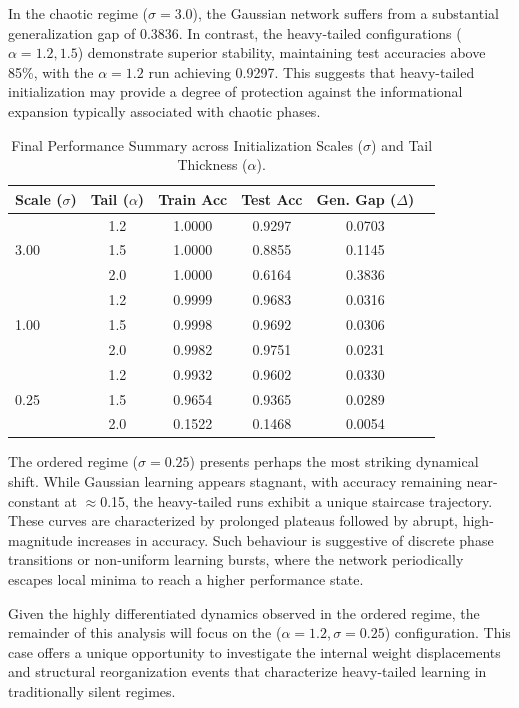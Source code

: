 \documentclass[11pt,a4paper]{article}
\begin{document}
In the chaotic regime ($\sigma=3.0$), the Gaussian network suffers from a substantial generalization gap of 0.3836. In contrast, the heavy-tailed configurations ($\alpha=1.2,1.5$) demonstrate superior stability, maintaining test accuracies above 85\%, with the $\alpha=1.2$ run achieving 0.9297. This suggests that heavy-tailed initialization may provide a degree of protection against the informational expansion typically associated with chaotic phases.

\begin{table}[htbp]
\centering
\caption{Final Performance Summary across Initialization Scales ($\sigma$) and Tail Thickness ($\alpha$).}
\label{tab:performance_summary}
\begin{tabular}{lccccr}
\toprule
\textbf{Scale ($\sigma$)} & \textbf{Tail ($\alpha$)} & \textbf{Train Acc} & \textbf{Test Acc} & \textbf{Gen. Gap ($\Delta$)} \\ \midrule
\multirow{3}{*}{3.00} & 1.2 & 1.0000 & 0.9297 & 0.0703 \\
                      & 1.5 & 1.0000 & 0.8855 & 0.1145\\
                      & 2.0 & 1.0000 & 0.6164 & 0.3836\\ \hline
\multirow{3}{*}{1.00} & 1.2 & 0.9999 & 0.9683 & 0.0316 \\
                      & 1.5 & 0.9998 & 0.9692 & 0.0306 \\
                      & 2.0 & 0.9982 & 0.9751 & 0.0231 \\ \hline
\multirow{3}{*}{0.25} & 1.2 & 0.9932 & 0.9602 & 0.0330 \\
                      & 1.5 & 0.9654 & 0.9365 & 0.0289 \\
                      & 2.0 & 0.1522 & 0.1468 & 0.0054 \\ \bottomrule
\end{tabular}
\end{table}

The ordered regime ($\sigma=0.25$) presents perhaps the most striking dynamical shift. While Gaussian learning appears stagnant, with accuracy remaining near-constant at $\approx$0.15, the heavy-tailed runs exhibit a unique staircase trajectory. These curves are characterized by prolonged plateaus followed by abrupt, high-magnitude increases in accuracy. Such behaviour is suggestive of discrete phase transitions or non-uniform learning bursts, where the network periodically escapes local minima to reach a higher performance state.

Given the highly differentiated dynamics observed in the ordered regime, the remainder of this analysis will focus on the ($\alpha=1.2,\sigma=0.25$) configuration. This case offers a unique opportunity to investigate the internal weight displacements and structural reorganization events that characterize heavy-tailed learning in traditionally silent regimes.
\newpage
\end{document}
